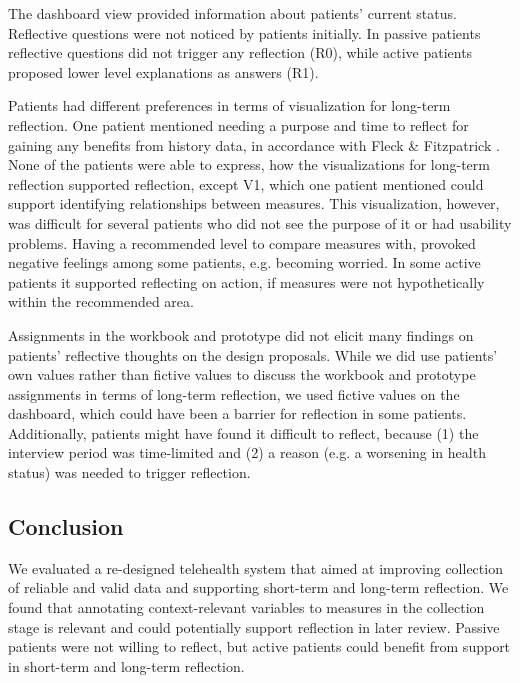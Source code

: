 The dashboard view provided information about patients’ current status. Reflective questions were not noticed by patients initially. In passive patients reflective questions did not trigger any reflection (R0), while active patients proposed lower level explanations as answers (R1). 

Patients had different preferences in terms of visualization for long-term reflection. One patient mentioned needing a purpose and time to reflect for gaining any benefits from history data, in accordance with Fleck \& Fitzpatrick \cite{Fleck}. None of the patients were able to express, how the visualizations for long-term reflection supported reflection, except V1, which one patient mentioned could support identifying relationships between measures. This visualization, however, was difficult for several patients who did not see the purpose of it or had usability problems. Having a recommended level to compare measures with, provoked negative feelings among some patients, e.g. becoming worried. In some active patients it supported reflecting on action, if measures were not hypothetically within the recommended area. 

Assignments in the workbook and prototype did not elicit many findings on patients’ reflective thoughts on the design proposals. While we did use patients’ own values rather than fictive values to discuss the workbook and prototype assignments in terms of long-term reflection, we used fictive values on the dashboard, which could have been a barrier for reflection in some patients. Additionally, patients might have found it difficult to reflect, because (1) the interview period was time-limited and (2) a reason (e.g. a worsening in health status) was needed to trigger reflection. 

\subsection{Conclusion}
We evaluated a re-designed telehealth system that aimed at improving collection of reliable and valid data and supporting short-term and long-term reflection. We found that annotating context-relevant variables to measures in the collection stage is relevant and could potentially support reflection in later review. Passive patients were not willing to reflect, but active patients could benefit from support in short-term and long-term reflection. 
